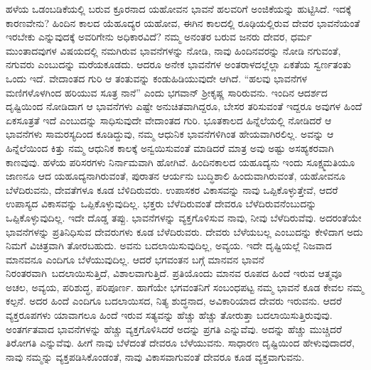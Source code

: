 ಹಳೆಯ ಒಡಂಬಡಿಕೆಯಲ್ಲಿ ಬರುವ ಕ್ರೂರನಾದ ಯಹೋವನ ಭಾವನೆ ಹಲವರಿಗೆ ಅಂಜಿಕೆಯನ್ನು ಹುಟ್ಟಿಸಿದೆ. ಇದಕ್ಕೆ ಕಾರಣವೇನು? ಹಿಂದಿನ ಕಾಲದ ಯೆಹೂದ್ಯರ ಯಹೋವ, ಈಗಿನ ಕಾಲದಲ್ಲಿ ರೂಢಿಯಲ್ಲಿರುವ ದೇವರ ಭಾವನೆಯಂತೆ ಇರಬೇಕು ಎನ್ನುವುದಕ್ಕೆ ಅವರಿಗೇನು ಅಧಿಕಾರವಿದೆ? ನಮ್ಮ ಅನಂತರ ಬರುವ ಜನರು ದೇವರ, ಧರ್ಮ ಮುಂತಾದವುಗಳ ವಿಷಯದಲ್ಲಿ ನಮಗಿರುವ ಭಾವನೆಗಳನ್ನು ನೋಡಿ, ನಾವು ಹಿಂದಿನವರನ್ನು ನೋಡಿ ನಗುವಂತೆ, ನಗುವರು ಎಂಬುದನ್ನು ಮರೆಯಕೂಡದು. ಆದರೂ ಅನೇಕ ಭಾವನೆಗಳ ಅಂತರಾಳದಲ್ಲೆಲ್ಲಾ ಏಕತೆಯ ಸ್ವರ್ಣತಂತು ಒಂದು ಇದೆ. ವೇದಾಂತದ ಗುರಿ ಆ ತಂತುವನ್ನು ಕಂಡುಹಿಡಿಯುವುದೇ ಆಗಿದೆ. “ಹಲವು ಭಾವನೆಗಳ ಮಣಿಗಳೊಳಗಿಂದ ಹರಿಯುವ ಸೂತ್ರ ನಾನೆ” ಎಂದು ಭಗವಾನ್​ ಶ‍್ರೀಕೃಷ್ಣ ಸಾರಿರುವನು. ಇಂದಿನ ಆದರ್ಶದ ದೃಷ್ಟಿಯಿಂದ ನೋಡಿದಾಗ ಆ ಭಾವನೆಗಳು ಎಷ್ಟೇ ಅನುಚಿತವಾಗಿದ್ದರೂ, ಬೇಸರ ತರಿಸುವಂತೆ ಇದ್ದರೂ ಅವುಗಳ ಹಿಂದೆ ಏಕಸೂತ್ರತೆ ಇದೆ ಎಂಬುದನ್ನು ಸಾಧಿಸುವುದೇ ವೇದಾಂತದ ಗುರಿ. ಭೂತಕಾಲದ ಹಿನ್ನೆಲೆಯಲ್ಲಿ ನೋಡಿದರೆ ಆ ಭಾವನೆಗಳು ಸಾಮರಸ್ಯದಿಂದ ಕೂಡಿದ್ದುವು, ನಮ್ಮ ಆಧುನಿಕ ಭಾವನೆಗಳಿಗಿಂತ ಹೇಯವಾಗಿರಲಿಲ್ಲ. ಅವನ್ನು ಆ ಹಿನ್ನೆಲೆಯಿಂದ ಕಿತ್ತು ನಮ್ಮ ಆಧುನಿಕ ಕಾಲಕ್ಕೆ ಅನ್ವಯಿಸುವಂತೆ ಮಾಡಿದರೆ ಮಾತ್ರ ಅವು ಅಷ್ಟು ಅಸಹ್ಯಕರವಾಗಿ ಕಾಣವುವು. ಹಳೆಯ ಪರಿಸರಗಳು ನಿರ್ನಾಮವಾಗಿ ಹೋಗಿವೆ. ಹಿಂದಿನಕಾಲದ ಯಹೂದ್ಯನು ಇಂದು ಸೂಕ್ಷ್ಮಮತಿಯೂ ಜಾಣನೂ ಆದ ಯಹೂದ್ಯನಾಗಿರುವಂತೆ, ಪುರಾತನ ಆರ್ಯನು ಬುದ್ಧಿಶಾಲಿ ಹಿಂದುವಾಗಿರುವಂತೆ, ಯಹೋವನೂ ಬೆಳೆದಿರುವನು, ದೇವತೆಗಳೂ ಕೂಡ ಬೆಳಿದಿರುವರು. ಉಪಾಸಕರ ವಿಕಾಸವನ್ನು ನಾವು ಒಪ್ಪಿಕೊಳ್ಳುತ್ತೇವೆ, ಆದರೆ ಉಪಾಸ್ಯದ ವಿಕಾಸವನ್ನು ಒಪ್ಪಿಕೊಳ್ಳುವುದಿಲ್ಲ. ಭಕ್ತರು ಬೆಳೆದಿರುವಂತೆ ದೇವರೂ ಬೆಳೆದಿರುವನೆಂಬುದನ್ನು ಒಪ್ಪಿಕೊಳ್ಳುವುದಿಲ್ಲ. ಇದೇ ದೊಡ್ಡ ತಪ್ಪು. ಭಾವನೆಗಳನ್ನು ವ್ಯಕ್ತಗೊಳಿಸುವ ನಾವು, ನೀವು ಬೆಳೆದಿರುವೆವು. ಅದರಂತೆಯೇ ಭಾವನೆಗಳನ್ನು ಪ್ರತಿನಿಧಿಸುವ ದೇವರುಗಳು ಕೂಡ ಬೆಳೆದಿರುವರು. ದೇವರು ಬೆಳೆಯಬಲ್ಲ ಎಂಬುದನ್ನು ಕೇಳಿದಾಗ ಅದು ನಿಮಗೆ ವಿಚಿತ್ರವಾಗಿ ತೋರಬಹುದು. ಅವನು ಬದಲಾಯಿಸುವುದಿಲ್ಲ, ಅವ್ಯಯ. ಇದೇ ದೃಷ್ಟಿಯಲ್ಲೆ ನಿಜವಾದ ಮಾನವನೂ ಎಂದಿಗೂ ಬೆಳೆಯುವುದಿಲ್ಲ. ಆದರೆ ಭಗವಂತನ ಬಗ್ಗೆ ಮಾನವನ ಭಾವನೆ ನಿರಂತರವಾಗಿ\break\ ಬದಲಾಯಿಸುತ್ತಿದೆ, ವಿಶಾಲವಾಗುತ್ತಿದೆ. ಪ್ರತಿಯೊಂದು ಮಾನವ ರೂಪದ ಹಿಂದೆ ಇರುವ ಆತ್ಮವೂ ಅಚಲ, ಅವ್ಯಯ, ಪರಿಶುದ್ಧ, ಪರಿಪೂರ್ಣ. ಹಾಗೆಯೇ ಭಗವಂತನಿಗೆ ಸಂಬಂಧಪಟ್ಟ ನಮ್ಮ ಭಾವನೆ ಕೂಡ ಕೇವಲ ನಮ್ಮ ಕಲ್ಪನೆ. ಅದರ ಹಿಂದೆ ಎಂದಿಗೂ ಬದಲಾಯಿಸದ, ನಿತ್ಯ ಶುದ್ಧನಾದ, ಅವಿಕಾರಿಯಾದ ದೇವರು ಇರುವನು. ಆದರೆ ವ್ಯಕ್ತರೂಪಗಳು ಯಾವಾಗಲೂ ಹಿಂದೆ ಇರುವ ಸತ್ಯವನ್ನು ಹೆಚ್ಚು ಹೆಚ್ಚು ತೋರುತ್ತಾ ಬದಲಾಯಿಸುತ್ತಿರುವುವು. ಅಂತರ್ಗತವಾದ ಭಾವನೆಗಳನ್ನು ಹೆಚ್ಚು ವ್ಯಕ್ತಗೊಳಿಸಿದರೆ ಅದನ್ನು ಪ್ರಗತಿ ಎನ್ನುವೆವು. ಅದನ್ನು ಹೆಚ್ಚು ಮುಚ್ಚಿದರೆ ತಿರೋಗತಿ ಎನ್ನುವೆವು. ಹೀಗೆ ನಾವು ಬೆಳೆದಂತೆ ದೇವರೂ ಬೆಳೆಯುವನು. ಸಾಧಾರಣ ದೃಷ್ಟಿಯಿಂದ ಹೇಳುವುದಾದರೆ, ನಾವು ನಮ್ಮನ್ನು ವ್ಯಕ್ತಪಡಿಸಿಕೊಂಡಂತೆ, ನಾವು ವಿಕಾಸವಾಗುವಂತೆ ದೇವರೂ ಕೂಡ ವ್ಯಕ್ತವಾಗುವನು.

\vskip 0.2cm

